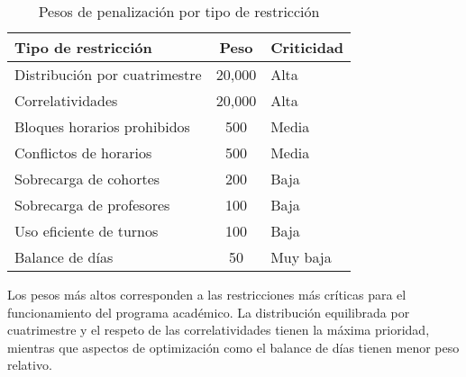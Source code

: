 \begin{table}[ht]
\centering
\begin{tabular}{|l|c|l|}
\hline
\textbf{Tipo de restricción} & \textbf{Peso} & \textbf{Criticidad} \\
\hline
Distribución por cuatrimestre & 20,000 & Alta \\
Correlatividades & 20,000 & Alta \\
Bloques horarios prohibidos & 500 & Media \\
Conflictos de horarios & 500 & Media \\
Sobrecarga de cohortes & 200 & Baja \\
Sobrecarga de profesores & 100 & Baja \\
Uso eficiente de turnos & 100 & Baja \\
Balance de días & 50 & Muy baja \\
\hline
\end{tabular}
\caption{Pesos de penalización por tipo de restricción}
\end{table}

Los pesos más altos corresponden a las restricciones más críticas para el funcionamiento del programa académico. La distribución equilibrada por cuatrimestre y el respeto de las correlatividades tienen la máxima prioridad, mientras que aspectos de optimización como el balance de días tienen menor peso relativo.